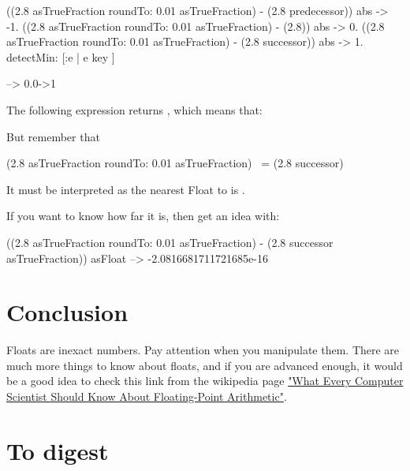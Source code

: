 \documentclass[a4paper,10pt,twoside]{book}
\begin{document}
\begin{code}{}
{
((2.8 asTrueFraction roundTo: 0.01 asTrueFraction) - (2.8 predecessor)) abs -> -1.
((2.8 asTrueFraction roundTo: 0.01 asTrueFraction) - (2.8)) abs -> 0.
((2.8 asTrueFraction roundTo: 0.01 asTrueFraction) - (2.8 successor)) abs -> 1.
} detectMin: [:e | e key ]

--> 0.0->1
\end{code}

The following expression returns , which means that:

But remember that 

\begin{code}{}
(2.8 asTrueFraction roundTo: 0.01 asTrueFraction) ~= (2.8 successor)
\end{code}

It must be interpreted as the nearest Float to  is .

If you want to know how far it is, then get an idea with:

\begin{code}{}
((2.8 asTrueFraction roundTo: 0.01 asTrueFraction) - (2.8 successor asTrueFraction)) asFloat
	--> -2.0816681711721685e-16
\end{code}



\section{Conclusion}
Floats are inexact numbers. Pay attention when you manipulate them.
There are much more things to know about floats, and if you are advanced enough, it would be a good idea to check this link from the wikipedia page \href{http://www.validlab.com/goldberg/paper.pdf}{"What Every Computer Scientist Should Know About Floating-Point Arithmetic"}.



\section{To digest}
\end{document}

